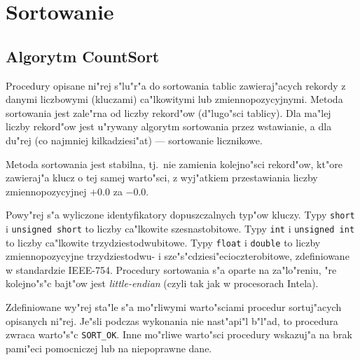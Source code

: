 \newpage
\section{Sortowanie}

\subsection{Algorytm CountSort}

Procedury opisane ni"rej s"lu"r"a do sortowania tablic zawieraj"acych
rekordy z danymi liczbowymi (kluczami) ca"lkowitymi lub zmiennopozycyjnymi.
Metoda sortowania jest zale"rna od liczby rekord"ow (d"lugo"sci tablicy).
Dla ma"lej liczby rekord"ow jest u"rywany algorytm sortowania przez
wstawianie, a dla du"rej (co najmniej kilkadziesi"at) --- sortowanie
licznikowe.

Metoda sortowania jest stabilna, tj.\ nie zamienia kolejno"sci rekord"ow,
kt"ore zawieraj"a klucz o tej samej warto"sci, z wyj"atkiem przestawiania
liczby zmiennopozycyjnej $+0.0$ za $-0.0$.

\vspace{\bigskipamount}
Powy"rej s"a wyliczone identyfikatory dopuszczalnych typ"ow kluczy. Typy
\texttt{short} i \texttt{unsigned short} to liczby ca"lkowite
szesnastobitowe. Typy \texttt{int} i
\texttt{unsigned int} to liczby ca"lkowite trzydziestodwubitowe. Typy
\texttt{float} i \texttt{double} to liczby zmiennopozycyjne trzydziestodwu-
i sze"s"cdziesi"ecioczterobitowe, zdefiniowane w standardzie IEEE-754.
Procedury sortowania s"a oparte na za"lo"reniu, "re kolejno"s"c bajt"ow jest
\emph{little-endian} (czyli tak jak w procesorach Intela).

\vspace{\bigskipamount}
Zdefiniowane wy"rej sta"le s"a mo"rliwymi warto"sciami procedur sortuj"acych
opisanych ni"rej. Je"sli podczas wykonania nie nast"api"l b"l"ad, to
procedura zwraca warto"s"c \texttt{SORT\_OK}. Inne mo"rliwe
warto"sci procedury wskazuj"a na brak pami"eci pomocniczej lub na
niepoprawne dane.


